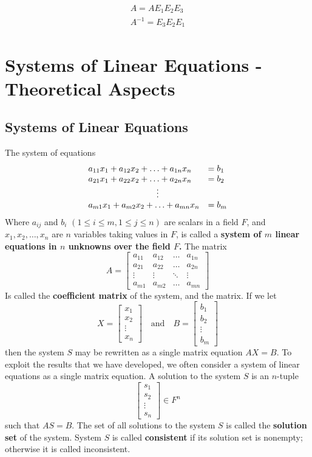 \documentclass[10pt, oneside]{article}
\begin{document}
\[
	\begin{split}
		A = A E_1 E_2 E_3  \\
		A^{-1} = E_3 E_2 E_1
	\end{split}
\]

\section{Systems of Linear Equations - Theoretical Aspects}

\subsection{Systems of Linear Equations}
The system of equations
\[
	\begin{array}{ll}
		a_{11}x_1 + a_{12}x_2 + \ldots + a_{1n}x_n & = b_1 \\
		a_{21}x_1 + a_{22}x_2 + \ldots + a_{2n}x_n & = b_2 \\
		\multicolumn{2}{c}{\vdots}                         \\
		a_{m1}x_1 + a_{m2}x_2 + \ldots + a_{mn}x_n & = b_m
	\end{array}
\]
Where $a_{ij}$ and $b_i$ $(1 \leq i \leq m, 1 \leq j \leq n)$ are scalars in a field $F$, and $x_1, x_2, \ldots, x_n$ are $n$ variables taking values in $F$, is called a
\textbf{system of $m$ linear equations in $n$ unknowns over the field $F$.} The matrix
\[
	A = \begin{bmatrix} a_{11} & a_{12} & \ldots & a_{1n} \\ a_{21} & a_{22} & \ldots & a_{2n} \\ \vdots & \vdots & \ddots & \vdots \\ a_{m1} & a_{m2} & \ldots & a_{mn} \end{bmatrix}
\]
Is called the \textbf{coefficient matrix} of the system, and the matrix. If we let
\[
	X = \begin{bmatrix} x_1 \\ x_2 \\ \vdots \\ x_n \end{bmatrix} \quad \text{and} \quad B = \begin{bmatrix} b_1 \\ b_2 \\ \vdots \\ b_m \end{bmatrix}
\]
then the system $S$ may be rewritten as a single matrix equation $AX = B$. To exploit the results that we have developed, we often consider a system of linear equations as a
single matrix equation. A solution to the system $S$ is an $n$-tuple
\[
	\begin{bmatrix} s_1 \\ s_2 \\ \vdots \\ s_n \end{bmatrix} \in F^n
\]
such that $AS = B$. The set of all solutions to the system $S$ is called the \textbf{solution set} of the system. System $S$ is called \textbf{consistent} if its solution set is nonempty; otherwise
it is called inconsistent.
\end{document}
